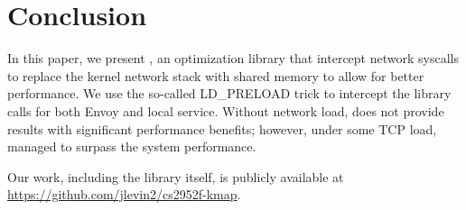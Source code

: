 \section{Conclusion}
\label{sec:conclusion}
In this paper, we present \sysname, an optimization library that intercept network syscalls to replace the kernel network stack with shared memory to allow for better performance. 
We use the so-called LD\_PRELOAD trick to intercept the library calls for both Envoy and local service.
Without network load, \sysname does not provide results with significant performance benefits; however, under some TCP load, \sysname managed to surpass the system performance.


Our work, including the library itself,  is publicly available at \href{https://github.com/jlevin2/cs2952f-kmap}{https://github.com/jlevin2/cs2952f-kmap}.